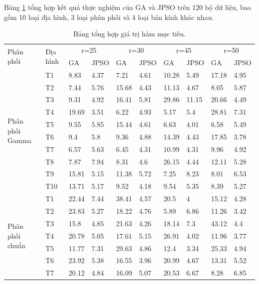 \documentclass{hust}
\begin{document}
Bảng \ref{fig:exp_table} tổng hợp kết quả thực nghiệm của \gls{GA} và \gls{JPSO} trên 120 bộ dữ liệu, bao gồm 10 loại địa hình, 3 loại phân phối và 4 loại bán kính khác nhau.

\begin{center}
\begin{table}[htb]
	\centering
	\caption{Bảng tổng hợp giá trị hàm mục tiêu.\label{fig:exp_table}}
\begin{adjustwidth}{-1.8cm}{}
\begin{tabular}{|l|l|l|l|l|l|l|l|l|l|}
	\hline
	\multirow{2}{*}{Phân phối} 
	& \multirow{2}{*}{Địa hình} 
	& \multicolumn{2}{c|}{r=25} & \multicolumn{2}{c|}{r=30} 
	& \multicolumn{2}{c|}{r=45} & \multicolumn{2}{c|}{r=50} \\ \cline{3-10} 
	&    &GA &JPSO  &GA &JPSO &GA &JPSO &GA &JPSO \\ \hline
	\multirow{10}{*}{Phân phối Gamma}   
	&T1	&8.83	&4.37	&7.21	&4.61	&10.28	&5.49	&17.18	&4.95	\\
	&T2	&7.44	&5.76	&15.68	&4.43	&11.13	&4.67	&8.05	&5.87	\\
	&T3	&9.31	&4.92	&16.41	&5.81	&29.86	&11.15	&20.66	&4.49	\\
	&T4	&19.69	&3.51	&6.22	&4.93	&5.17	&5.4	&28.81	&7.31	\\
	&T5	&9.55	&5.85	&15.44	&4.61	&6.63	&4.01	&6.58	&5.49	\\
	&T6	&9.4	&5.8	&9.36	&4.88	&14.39	&4.43	&17.85	&3.78	\\
	&T7	&6.57	&5.63	&6.45	&4.31	&10.99	&4.31	&9.96	&4.92	\\
	&T8	&7.87	&7.94	&8.31	&4.6	&26.15	&4.44	&12.11	&5.28	\\
	&T9	&15.81	&5.15	&11.38	&5.72	&7.25	&8.23	&8.01	&6.53	\\
	&T10	&13.71	&5.17	&9.52	&4.18	&9.54	&5.35	&8.39	&5.27	\\ \hline
	\multirow{10}{*}{Phân phối chuẩn}  
	&T1	&22.44	&7.44	&38.41	&4.57	&20.5	&4	&15.12	&4.28	\\
	&T2	&23.83	&5.27	&18.22	&4.76	&5.89	&6.86	&11.26	&3.42	\\
	&T3	&15.8	&4.85	&21.63	&4.26	&18.14	&7.3	&43.12	&4.4	\\
	&T4	&20.78	&5.05	&17.61	&5.15	&26.91	&4.02	&11.96	&3.77	\\
	&T5	&11.77	&7.31	&29.63	&4.86	&12.4	&3.34	&25.33	&4.94	\\
	&T6	&23.92	&5.38	&16.55	&3.96	&20.99	&4.67	&13.31	&5.52	\\
	&T7	&20.12	&4.84	&16.09	&5.07	&20.53	&6.67	&8.28	&6.85	\\

\end{tabular}
\end{adjustwidth}
\end{table}
\end{center}
\end{document}
